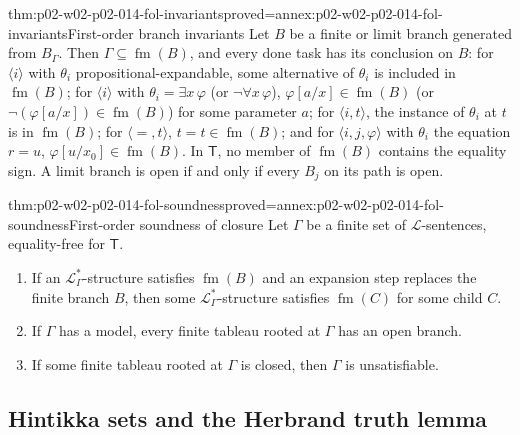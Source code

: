 \begin{hblemma}{thm:p02-w02-p02-014-fol-invariants}{proved=annex:p02-w02-p02-014-fol-invariants}{First-order branch invariants}
Let \(B\) be a finite or limit branch generated from \(B_\Gamma\).  Then
\(\Gamma\subseteq\operatorname{fm}(B)\), and every done task has its conclusion on \(B\):
for \(\langle i\rangle\) with \(\theta_i\) propositional-expandable, some
alternative of \(\theta_i\) is included in \(\operatorname{fm}(B)\); for
\(\langle i\rangle\) with \(\theta_i=\exists x\,\varphi\) (or
\(\neg\forall x\,\varphi\)), \(\varphi[a/x]\in\operatorname{fm}(B)\) (or
\(\neg(\varphi[a/x])\in\operatorname{fm}(B)\)) for some parameter \(a\); for
\(\langle i,t\rangle\), the instance of \(\theta_i\) at \(t\) is in \(\operatorname{fm}(B)\);
for \(\langle{=},t\rangle\), \(t=t\in\operatorname{fm}(B)\); and for
\(\langle i,j,\varphi\rangle\) with \(\theta_i\) the equation \(r=u\),
\(\varphi[u/x_0]\in\operatorname{fm}(B)\).  In \(\mathsf T\), no member of \(\operatorname{fm}(B)\)
contains the equality sign.  A limit branch is open if and only if every
\(B_j\) on its path is open.
\end{hblemma}

\begin{hbtheorem}{thm:p02-w02-p02-014-fol-soundness}{proved=annex:p02-w02-p02-014-fol-soundness}{First-order soundness of closure}
Let \(\Gamma\) be a finite set of \(\mathcal L\)-sentences, equality-free
for \(\mathsf T\).
\begin{enumerate}
  \item If an \(\mathcal L_{\Gamma}^{*}\)-structure satisfies \(\operatorname{fm}(B)\) and
        an expansion step replaces the finite branch \(B\), then some
        \(\mathcal L_{\Gamma}^{*}\)-structure satisfies \(\operatorname{fm}(C)\) for some
        child \(C\).
  \item If \(\Gamma\) has a model, every finite tableau rooted at \(\Gamma\)
        has an open branch.
  \item If some finite tableau rooted at \(\Gamma\) is closed, then
        \(\Gamma\) is unsatisfiable.
\end{enumerate}
\end{hbtheorem}

\subsection{Hintikka sets and the Herbrand truth lemma}
\label{sec:p02-w02-p02-014-fol-herbrand}

